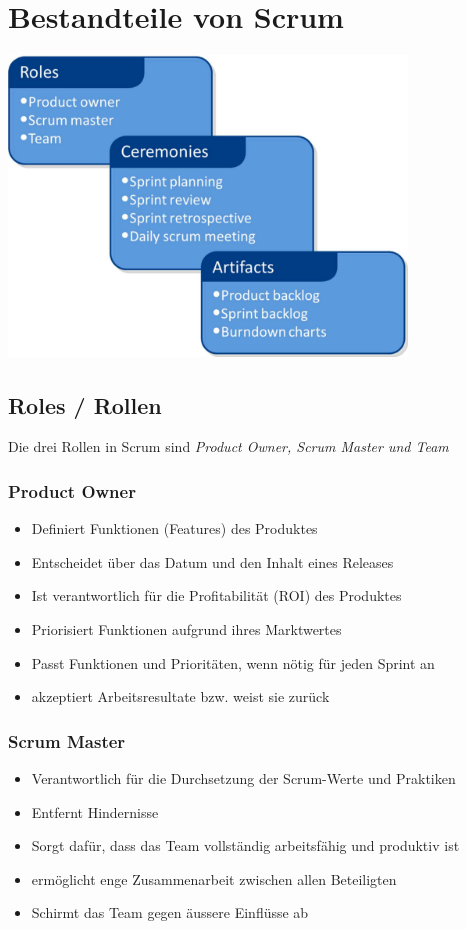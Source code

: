 \documentclass{report}
\newenvironment{Figure}
	{\par\medskip\noindent\minipage{\linewidth}}
	{\endminipage\par\medskip}
\theoremstyle{definition}
\theoremstyle{example}
\begin{document}
\section{Bestandteile von Scrum}
\begin{Figure}
\centering
\includegraphics[width=400px]{img/BestandteileScrum.png}
	\label{fig:Die Bestandteile von Scrum}
\end{Figure}

\subsection{Roles / Rollen}
Die drei Rollen in Scrum sind \textit{Product Owner, Scrum Master und Team}

\subsubsection{Product Owner}
\begin{itemize}
	\item Definiert Funktionen (Features) des Produktes
	\item Entscheidet über das Datum und den Inhalt eines Releases
	\item Ist verantwortlich für die Profitabilität (ROI) des Produktes
	\item Priorisiert Funktionen aufgrund ihres Marktwertes
	\item Passt Funktionen und Prioritäten, wenn nötig für jeden Sprint an
	\item akzeptiert Arbeitsresultate bzw. weist sie zurück
\end{itemize}

\subsubsection{Scrum Master}
\begin{itemize}
	\item Verantwortlich für die Durchsetzung der Scrum-Werte und Praktiken
	\item Entfernt Hindernisse
	\item Sorgt dafür, dass das Team vollständig arbeitsfähig und produktiv ist
	\item ermöglicht enge Zusammenarbeit zwischen allen Beteiligten
	\item Schirmt das Team gegen äussere Einflüsse ab
\end{itemize}
\end{document}
